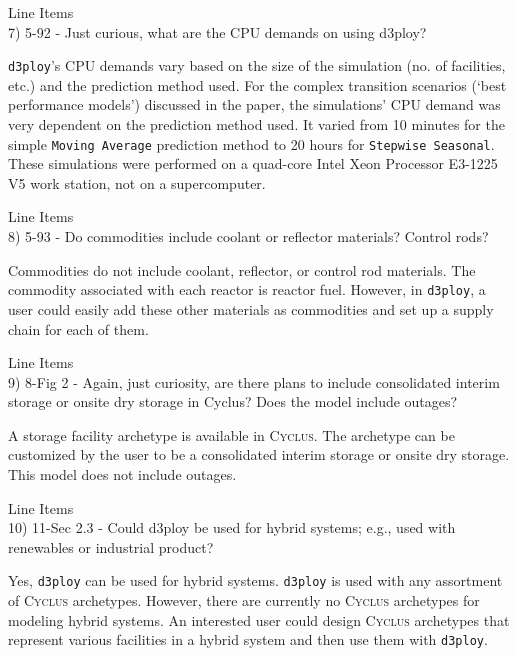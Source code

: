 \documentclass[answers,11pt]{exam}
\newcommand{\Cyclus}{\textsc{Cyclus}\xspace}%
\newcommand{\deploy}{\texttt{d3ploy}\xspace}%
\begin{document}
\begin{questions}
\question Line Items \\
7) 5-92 - Just curious, what are the CPU demands on using d3ploy?

\begin{solution}
\deploy's CPU demands vary based on the size of the simulation (no. of facilities, etc.) 
and the prediction method used. 
For the complex transition scenarios (`best performance models') discussed in the paper, 
the simulations' CPU demand was very dependent on the prediction method used. It varied from 
10 minutes for the simple \texttt{Moving Average} prediction method to 20 hours for 
\texttt{Stepwise Seasonal}. These simulations were performed on a quad-core Intel Xeon Processor 
E3-1225 V5 work station, not on a supercomputer. 
\end{solution}

\question Line Items \\
8) 5-93 - Do commodities include coolant or reflector materials? Control rods?
\begin{solution}
Commodities do not include coolant, reflector, or control rod materials. The commodity associated 
with each reactor is reactor fuel. However, in \deploy, a user could easily add these other 
materials as commodities and set up a supply chain for each of them.  
\end{solution}

\question Line Items \\
9) 8-Fig 2 - Again, just curiosity, are there plans to include consolidated interim storage or onsite dry
storage in Cyclus? Does the model include outages?

\begin{solution}
A storage facility archetype is available in \Cyclus. The archetype can be customized by the user to be a 
consolidated interim storage or onsite dry storage. This model does not include outages. 
\end{solution}

\question Line Items \\
10) 11-Sec 2.3 - Could d3ploy be used for hybrid systems; e.g., used with renewables or industrial product?

\begin{solution}
Yes, \deploy can be used for hybrid systems. \deploy is used with any assortment of 
\Cyclus archetypes. However, there are currently no \Cyclus archetypes for modeling hybrid 
systems. An interested user could design \Cyclus archetypes that represent various facilities 
in a hybrid system and then use them with \deploy.
\end{solution}


\end{questions}
\end{document}
